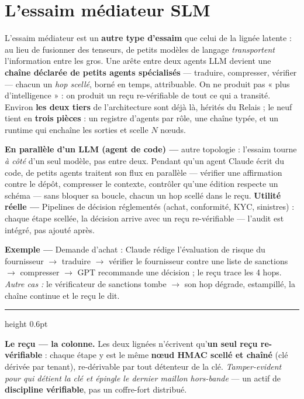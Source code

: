 \documentclass[11pt]{article}
\newcommand{\exemple}[1]{{\color{efeamber}\textbf{Exemple —} }#1\par}
\newcommand{\utilite}[1]{{\color{efeplum}\textbf{Utilité réelle —} }#1\par}
\begin{document}
\section{L'essaim médiateur SLM}
L'essaim médiateur est un \textbf{autre type d'essaim} que celui de la lignée latente : au lieu de
fusionner des tenseurs, de petits modèles de langage \emph{transportent} l'information entre les
gros. Une arête entre deux agents LLM devient une \textbf{chaîne déclarée de petits agents
spécialisés} — traduire, compresser, vérifier — chacun un \emph{hop scellé}, borné en temps,
attribuable. On ne produit pas « plus d'intelligence » : on produit un reçu re-vérifiable de tout
ce qui a transité. Environ \textbf{les deux tiers} de l'architecture sont déjà là, hérités du
Relais ; le neuf tient en \textbf{trois pièces} : un registre d'agents par rôle, une chaîne typée,
et un runtime qui enchaîne les sorties et scelle $N$ n\oe uds.
\par\smallskip
{\color{efenavy}\textbf{En parallèle d'un LLM (agent de code) —}} autre topologie : l'essaim tourne
\emph{à côté} d'un seul modèle, pas entre deux. Pendant qu'un agent Claude écrit du code, de petits
agents traitent son flux en parallèle — vérifier une affirmation contre le dépôt, compresser le
contexte, contrôler qu'une édition respecte un schéma — sans bloquer sa boucle, chacun un hop
scellé dans le reçu.
\utilite{Pipelines de décision réglementés (achat, conformité, KYC, sinistres) : chaque étape
scellée, la décision arrive avec un reçu re-vérifiable — l'audit est intégré, pas ajouté après.}
\exemple{Demande d'achat : Claude rédige l'évaluation de risque du fournisseur $\rightarrow$
traduire $\rightarrow$ vérifier le fournisseur contre une liste de sanctions $\rightarrow$
compresser $\rightarrow$ GPT recommande une décision ; le reçu trace les 4 hops. \emph{Autre cas :}
le vérificateur de sanctions tombe $\rightarrow$ son hop dégrade, estampillé, la chaîne continue et
le reçu le dit.}

\vspace{3pt}
{\color{boxedge}\hrule height 0.6pt}
\vspace{3pt}
{\color{efenavy}\textbf{Le reçu — la colonne.}} Les deux lignées n'écrivent qu'\textbf{un seul reçu
re-vérifiable} : chaque étape y est le même \textbf{n\oe ud HMAC scellé et chaîné} (clé dérivée par
tenant), re-dérivable par tout détenteur de la clé. \emph{Tamper-evident pour qui détient la clé et
épingle le dernier maillon hors-bande} — un actif de \textbf{discipline vérifiable}, pas un
coffre-fort distribué.
\end{document}
